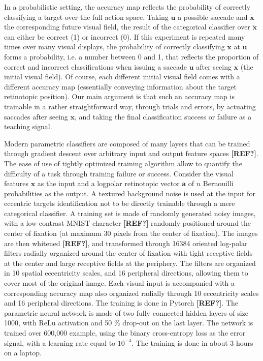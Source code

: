 In a probabilistic setting, the accuracy map reflects the probability of correctly classifying a target over the full action space. Taking $\boldsymbol{u}$ a possible saccade and $\tilde{\boldsymbol{x}}$ the corresponding future visual field, the result of the categorical classifier over $\tilde{\boldsymbol{x}}$ can either be correct (1) or incorrect (0). If this experiment is repeated many times over many visual displays, the probability of correctly classifying $\tilde{\boldsymbol{x}}$ at $\boldsymbol{u}$ forms a probability, i.e. a number between 0 and 1, that reflects the proportion of correct and incorrect classifications when issuing a saccade $\boldsymbol{u}$ after seeing $\boldsymbol{x}$ (the initial visual field). Of course, each different initial visual field comes with a different accuracy map (essentially conveying information about the target retinotopic position).
Our main argument is that such an accuracy map is trainable in a rather straightforward way, through trials and errors, by actuating saccades after seeing $\boldsymbol{x}$, and taking the final classification success or failure as a teaching signal.

Modern parametric classifiers are composed of many layers that can be trained through gradient descent over arbitrary input and output feature spaces {\bf [REF?]}. The ease of use of tightly optimized training algorithm allow to quantify the difficulty of a task through training failure or success. Consider the visual features  $\boldsymbol{x}$ as the input and a logpolar retinotopic vector $\boldsymbol{a}$ of $n$ Bernouilli probabilities as the output. A textured background noise is used at the input for eccentric targets identification not to be directly trainable through a mere categorical classifier. A training set is made of randomly generated noisy images, with a low-contrast MNIST character {\bf [REF?]} randomly positioned around the center of fixation (at maximum 30 pixels from the center of fixation). The images are then whitened {\bf [REF?]}, and transformed through 16384 oriented log-polar filters radially organized around the center of fixation with tight receptive fields at the center and large receptive fields at the periphery. The filters are organized in 10 spatial eccentricity scales, and 16 peripheral directions, allowing them to cover most of the original image. Each visual input is accompanied with a corresponding accuracy map also organized radially through 10 eccentricity scales and 16 peripheral directions. The training is done in Pytorch {\bf [REF?]}. The parametric neural network is made of two fully connected hidden layers of size 1000, with ReLu activation and 50 \% drop-out on the last layer. The network is trained over 600,000 example, using the binary cross-entropy loss as the error signal, with a learning rate equal to $10^{-4}$. The training is done in about 3 hours on a laptop.  


